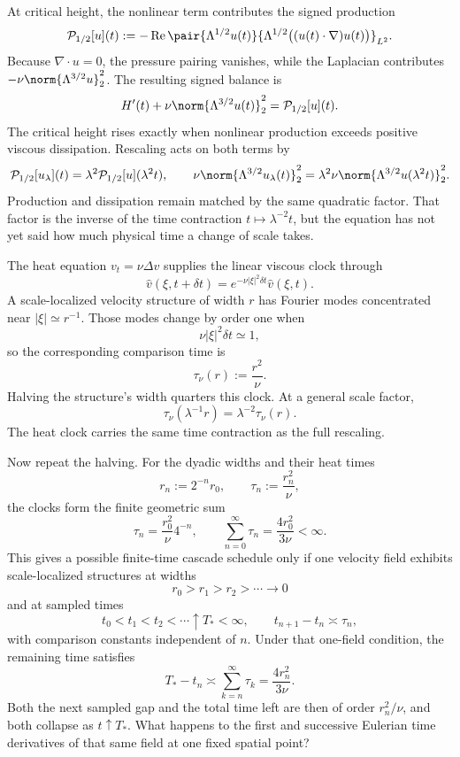 
At critical height, the nonlinear term contributes the signed production
\[
  \mathcal P_{1/2}[u](t)
  :=
  -\operatorname{Re}
  \pair
    {\Lambda^{1/2}u(t)}
    {\Lambda^{1/2}\bigl((u(t)\cdot\nabla)u(t)\bigr)}_{L^2}.
\]
Because \(\nabla\cdot u=0\), the pressure pairing vanishes, while the Laplacian contributes \(-\nu\norm{\Lambda^{3/2}u}_2^2\). The resulting signed balance is
\[
  H'(t)
  +
  \nu\norm{\Lambda^{3/2}u(t)}_2^2
  =
  \mathcal P_{1/2}[u](t).
\]
The critical height rises exactly when nonlinear production exceeds positive viscous dissipation. Rescaling acts on both terms by
\[
  \mathcal P_{1/2}[u_\lambda](t)
  =
  \lambda^2\mathcal P_{1/2}[u](\lambda^2t),
  \qquad
  \nu\norm{\Lambda^{3/2}u_\lambda(t)}_2^2
  =
  \lambda^2\nu\norm{\Lambda^{3/2}u(\lambda^2t)}_2^2.
\]
Production and dissipation remain matched by the same quadratic factor. That factor is the inverse of the time contraction \(t\mapsto\lambda^{-2}t\), but the equation has not yet said how much physical time a change of scale takes.


The heat equation \(v_t=\nu\Delta v\) supplies the linear viscous clock through
\[
  \widehat v(\xi,t+\delta t)
  =
  e^{-\nu|\xi|^2\delta t}\widehat v(\xi,t).
\]
A scale-localized velocity structure of width \(r\) has Fourier modes concentrated near \(|\xi|\simeq r^{-1}\). Those modes change by order one when
\[
  \nu|\xi|^2\delta t\simeq1,
\]
so the corresponding comparison time is
\[
  \tau_\nu(r)
  :=
  \frac{r^2}{\nu}.
\]
Halving the structure's width quarters this clock. At a general scale factor,
\[
  \tau_\nu(\lambda^{-1}r)
  =
  \lambda^{-2}\tau_\nu(r).
\]
The heat clock carries the same time contraction as the full \NavierStokes{} rescaling.


Now repeat the halving. For the dyadic widths and their heat times
\[
  r_n:=2^{-n}r_0,
  \qquad
  \tau_n:=\frac{r_n^2}{\nu},
\]
the clocks form the finite geometric sum
\[
  \tau_n
  =
  \frac{r_0^2}{\nu}4^{-n},
  \qquad
  \sum_{n=0}^{\infty}\tau_n
  =
  \frac{4r_0^2}{3\nu}
  <
  \infty.
\]
This gives a possible finite-time cascade schedule only if one \NavierStokes{} velocity field exhibits scale-localized structures at widths
\[
  r_0>r_1>r_2>\cdots\longrightarrow0
\]
and at sampled times
\[
  t_0<t_1<t_2<\cdots\uparrow T_*<\infty,
  \qquad
  t_{n+1}-t_n\asymp\tau_n,
\]
with comparison constants independent of \(n\). Under that one-field condition, the remaining time satisfies
\[
  T_*-t_n
  \asymp
  \sum_{k=n}^{\infty}\tau_k
  =
  \frac{4r_n^2}{3\nu}.
\]
Both the next sampled gap and the total time left are then of order \(r_n^2/\nu\), and both collapse as \(t\uparrow T_*\). What happens to the first and successive Eulerian time derivatives of that same field at one fixed spatial point?

